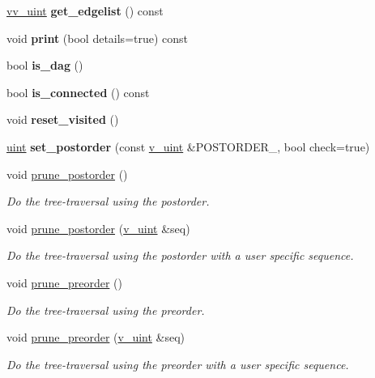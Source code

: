 \begin{DoxyCompactItemize}
\mbox{\label{classpruner_1_1Tree_affd2187b4923fe8a6f546c5ffc2e512e}} 
\hyperlink{namespacepruner_acc0badaa0c5a170f5f93cfc20ec428a2}{vv\+\_\+uint} {\bfseries get\+\_\+edgelist} () const
\item 
\mbox{\label{classpruner_1_1Tree_ac33eb096654afd2af8db760c5c87a0b5}} 
void {\bfseries print} (bool details=true) const
\item 
\mbox{\label{classpruner_1_1Tree_af72220d2b88958648bf1ecc3fb9c9de1}} 
bool {\bfseries is\+\_\+dag} ()
\item 
\mbox{\label{classpruner_1_1Tree_a3e868fcc3476f3d0eba38fa60782cae9}} 
bool {\bfseries is\+\_\+connected} () const
\item 
\mbox{\label{classpruner_1_1Tree_a5bcdbaa9fe66899d8ef30f4c0000935a}} 
void {\bfseries reset\+\_\+visited} ()
\item 
\mbox{\label{classpruner_1_1Tree_a59bf8f7afc1153363e9718fd28f41b27}} 
\hyperlink{namespacepruner_a659e6e64a9e2b8e981c3d34262a2f67e}{uint} {\bfseries set\+\_\+postorder} (const \hyperlink{namespacepruner_af0145646bd7ede012cd336b416bc5579}{v\+\_\+uint} \&P\+O\+S\+T\+O\+R\+D\+E\+R\+\_\+, bool check=true)
\item 
void \hyperlink{classpruner_1_1Tree_a7e50f34814e6f158cbff23dbe0312a8e}{prune\+\_\+postorder} ()
\begin{DoxyCompactList}\small\item\em Do the tree-\/traversal using the postorder. \end{DoxyCompactList}\item 
void \hyperlink{classpruner_1_1Tree_af3b41db2b06a4cac7f2cdb25963e3e3c}{prune\+\_\+postorder} (\hyperlink{namespacepruner_af0145646bd7ede012cd336b416bc5579}{v\+\_\+uint} \&seq)
\begin{DoxyCompactList}\small\item\em Do the tree-\/traversal using the postorder with a user specific sequence. \end{DoxyCompactList}\item 
void \hyperlink{classpruner_1_1Tree_a960ac327488daa6b2de86ea7be5aee7d}{prune\+\_\+preorder} ()
\begin{DoxyCompactList}\small\item\em Do the tree-\/traversal using the preorder. \end{DoxyCompactList}\item 
void \hyperlink{classpruner_1_1Tree_afb20a52559dd24b773a694dcbb76ef5c}{prune\+\_\+preorder} (\hyperlink{namespacepruner_af0145646bd7ede012cd336b416bc5579}{v\+\_\+uint} \&seq)
\begin{DoxyCompactList}\small\item\em Do the tree-\/traversal using the preorder with a user specific sequence. \end{DoxyCompactList}\end{DoxyCompactItemize}
